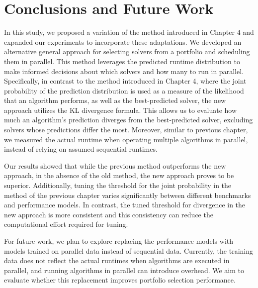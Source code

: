\section{Conclusions and Future Work}

In this study, we proposed a variation of the method introduced in Chapter 4 and expanded our experiments to incorporate these adaptations. We developed an alternative general approach for selecting solvers from a portfolio and scheduling them in parallel. This method leverages the predicted runtime distribution to make informed decisions about which solvers and how many to run in parallel. Specifically, in contrast to the method introduced in Chapter 4, where the joint probability of the prediction distribution is used as a measure of the likelihood that an algorithm performs, as well as the best-predicted solver, the new approach utilizes the KL divergence formula. This allows us to evaluate how much an algorithm's prediction diverges from the best-predicted solver, excluding solvers whose predictions differ the most. Moreover, similar to previous chapter, we measured the actual runtime when operating multiple algorithms in parallel, instead of relying on assumed sequential runtimes. 

Our results showed that while the previous method outperforms the new approach, in the absence of the old method, the new approach proves to be superior. Additionally, tuning the threshold for the joint probability in the method of the previous chapter varies significantly between different benchmarks and performance models. In contrast, the tuned threshold for divergence in the new approach is more consistent and this consistency can reduce the computational effort required for tuning.

For future work, we plan to explore replacing the performance models with models trained on parallel data instead of sequential data. Currently, the training data does not reflect the actual runtimes when algorithms are executed in parallel, and running algorithms in parallel can introduce overhead. We aim to evaluate whether this replacement improves portfolio selection performance.
  
